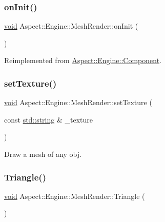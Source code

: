 \subsubsection{\texorpdfstring{on\+Init()}{onInit()}}
{\footnotesize\ttfamily \mbox{\hyperlink{_s_d_l__opengles2__gl2ext_8h_ae5d8fa23ad07c48bb609509eae494c95}{void}} Aspect\+::\+Engine\+::\+Mesh\+Render\+::on\+Init (\begin{DoxyParamCaption}{ }\end{DoxyParamCaption})\hspace{0.3cm}{\ttfamily [virtual]}}



Reimplemented from \mbox{\hyperlink{class_aspect_1_1_engine_1_1_component_a3a1fbf76e3fd208be7ffe0ffa449dcf9}{Aspect\+::\+Engine\+::\+Component}}.

\mbox{\label{class_aspect_1_1_engine_1_1_mesh_render_aadfc13cdafe27ff3f63e80e68fdfbaa0}} 
\subsubsection{\texorpdfstring{set\+Texture()}{setTexture()}}
{\footnotesize\ttfamily \mbox{\hyperlink{_s_d_l__opengles2__gl2ext_8h_ae5d8fa23ad07c48bb609509eae494c95}{void}} Aspect\+::\+Engine\+::\+Mesh\+Render\+::set\+Texture (\begin{DoxyParamCaption}\item[{const \mbox{\hyperlink{_s_d_l__opengl__glext_8h_ae84541b4f3d8e1ea24ec0f466a8c568b}{std\+::string}} \&}]{\+\_\+texture }\end{DoxyParamCaption})}



Draw a mesh of any obj. 

\mbox{\label{class_aspect_1_1_engine_1_1_mesh_render_ae8ca6b05b335b228943f4c034c02100d}} 
\subsubsection{\texorpdfstring{Triangle()}{Triangle()}}
{\footnotesize\ttfamily \mbox{\hyperlink{_s_d_l__opengles2__gl2ext_8h_ae5d8fa23ad07c48bb609509eae494c95}{void}} Aspect\+::\+Engine\+::\+Mesh\+Render\+::\+Triangle (\begin{DoxyParamCaption}{ }\end{DoxyParamCaption})}



